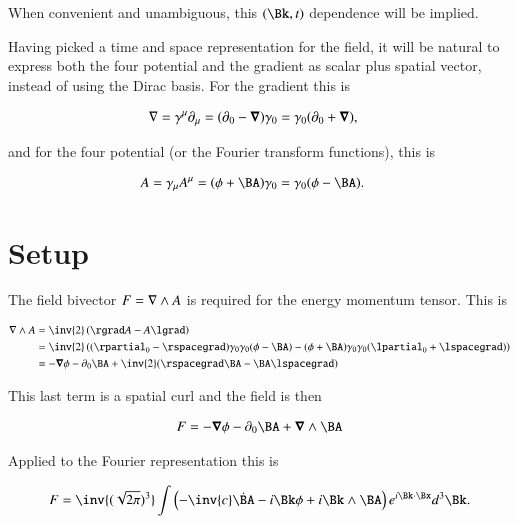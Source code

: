 When convenient and unambiguous, this $(\Bk,t)$ dependence will be implied.

Having picked a time and space representation for the field, it will be natural to express both the four potential and the gradient as scalar plus spatial vector, instead of using the Dirac basis.  For the gradient this is

\begin{align}
\label{eqn:ftMaxVacuum:4}
\nabla &= \gamma^\mu \partial_\mu = (\partial_0 - \boldsymbol{\nabla}) \gamma_0 = \gamma_0 (\partial_0 + \boldsymbol{\nabla}),
\end{align}

and for the four potential (or the Fourier transform functions), this is

\begin{align}
\label{eqn:ftMaxVacuum:5}
A &= \gamma_\mu A^\mu = (\phi + \BA) \gamma_0 = \gamma_0 (\phi - \BA).
\end{align}

\section{Setup}

The field bivector $F = \nabla \wedge A$ is required for the energy momentum tensor.  This is

\begin{align*}
\grad \wedge A
&= \inv{2}\left( \rgrad A - A \lgrad \right) \\
&= \inv{2}\left( (\rpartial_0 - \rspacegrad) \gamma_0 \gamma_0 (\phi - \BA)
-
(\phi + \BA) \gamma_0 \gamma_0 (\lpartial_0 + \lspacegrad)
\right) \\
&= -\spacegrad \phi -\partial_0 \BA + \inv{2}(\rspacegrad \BA - \BA \lspacegrad)
\end{align*}

This last term is a spatial curl and the field is then

\begin{align}
\label{eqn:ftMaxVacuum:6}
F = -\spacegrad \phi -\partial_0 \BA + \spacegrad \wedge \BA
\end{align}

Applied to the Fourier representation this is

\begin{align}
\label{eqn:ftMaxVacuum:7}
F =
\inv{(\sqrt{2 \pi})^3} \int
\left(
- \inv{c} \dot{\BA}
- i \Bk \phi
+ i \Bk \wedge \BA
\right)
e^{i \Bk \cdot \Bx } d^3 \Bk.
\end{align}

